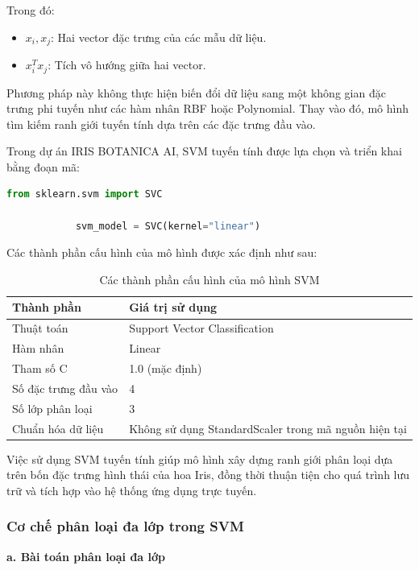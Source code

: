 \documentclass[14pt]{extarticle}
\begin{document}
		\noindent
		Trong đó:
		
		\begin{itemize}
			\item $x_i,x_j$: Hai vector đặc trưng của các mẫu dữ liệu.
			\item $x_i^Tx_j$: Tích vô hướng giữa hai vector.
		\end{itemize}
		
		\noindent
		Phương pháp này không thực hiện biến đổi dữ liệu sang một không gian đặc trưng phi tuyến như các hàm nhân RBF hoặc Polynomial. Thay vào đó, mô hình tìm kiếm ranh giới tuyến tính dựa trên các đặc trưng đầu vào.
		
		\noindent
		Trong dự án IRIS BOTANICA AI, SVM tuyến tính được lựa chọn và triển khai bằng đoạn mã:
		
		\begin{lstlisting}[language=Python]
			from sklearn.svm import SVC
			
			svm_model = SVC(kernel="linear")
		\end{lstlisting}
		
		\noindent
		Các thành phần cấu hình của mô hình được xác định như sau:
		
		\begin{table}[H]
			\centering
			\caption{Các thành phần cấu hình của mô hình SVM}
			\label{tab:svm_config}
			\begin{tabular}{|p{5cm}|p{6cm}|}
				\hline
				\textbf{Thành phần} & \textbf{Giá trị sử dụng} \\
				\hline
				Thuật toán & Support Vector Classification \\
				\hline
				Hàm nhân & Linear \\
				\hline
				Tham số C & 1.0 (mặc định) \\
				\hline
				Số đặc trưng đầu vào & 4 \\
				\hline
				Số lớp phân loại & 3 \\
				\hline
				Chuẩn hóa dữ liệu & Không sử dụng StandardScaler trong mã nguồn hiện tại \\
				\hline
			\end{tabular}
		\end{table}
		
		\noindent
		Việc sử dụng SVM tuyến tính giúp mô hình xây dựng ranh giới phân loại dựa trên bốn đặc trưng hình thái của hoa Iris, đồng thời thuận tiện cho quá trình lưu trữ và tích hợp vào hệ thống ứng dụng trực tuyến.
		
		\subsubsection{Cơ chế phân loại đa lớp trong SVM}
	\textbf{a. Bài toán phân loại đa lớp}
		
\end{document}
